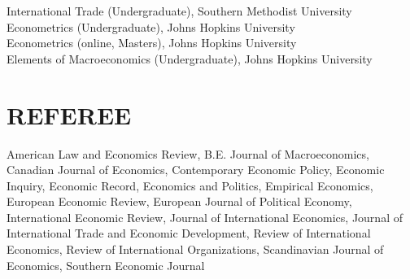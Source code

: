 \documentclass[11pt]{res}
\begin{document}
\begin{resume}

\phantom{.}\vspace{.05cm}
International Trade (Undergraduate), Southern Methodist University\vspace{1.5mm}\\
Econometrics (Undergraduate), Johns Hopkins University\vspace{1.5mm}\\
Econometrics (online, Masters), Johns Hopkins University\vspace{1.5mm}\\
Elements of Macroeconomics (Undergraduate), Johns Hopkins University\vspace{1.5mm}\\

\section{REFEREE} \vspace{1.5mm}
American Law and Economics Review, B.E. Journal of Macroeconomics, Canadian Journal of Economics, Contemporary Economic Policy, Economic Inquiry, 
Economic Record, Economics and Politics, Empirical Economics, European Economic Review, European Journal of Political Economy, International Economic Review, Journal of International Economics, Journal of International Trade and Economic Development, Review of International Economics, Review of International Organizations, Scandinavian Journal of Economics, Southern Economic Journal
\end{resume}
\end{document}
